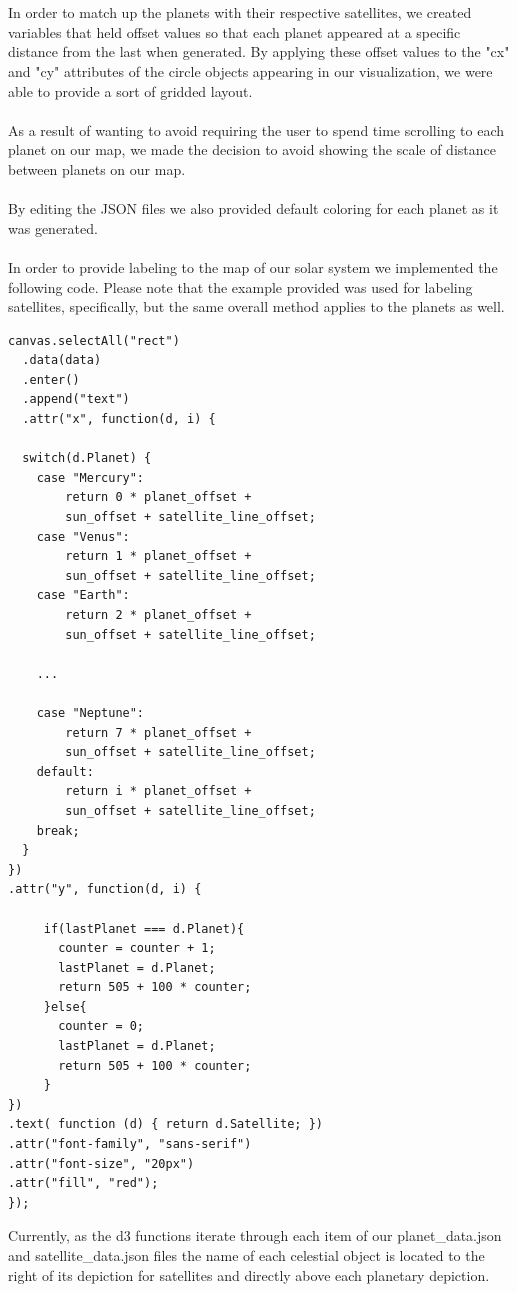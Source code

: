 \documentclass[journal]{vgtc}                %
\begin{document}
\\\\
In order to match up the planets with their respective satellites, we created variables that held offset values so that each planet appeared at a specific distance from the last when generated. By applying these offset values to the "cx" and "cy" attributes of the circle objects appearing in our visualization, we were able to provide a sort of gridded layout. 
\\\\
As a result of wanting to avoid requiring the user to spend time scrolling to each planet on our map, we made the decision to avoid showing the scale of distance between planets on our map. 
\\\\
By editing the JSON files we also provided default coloring for each planet as it was generated.
\\\\
In order to provide labeling to the map of our solar system we implemented the following code. Please note that the example provided was used for labeling satellites, specifically, but the same overall method applies to the planets as well. 
\begin{lstlisting}[frame=single]
canvas.selectAll("rect")
  .data(data)
  .enter()
  .append("text")
  .attr("x", function(d, i) { 

  switch(d.Planet) {
    case "Mercury":
    	return 0 * planet_offset + 
    	sun_offset + satellite_line_offset;
    case "Venus":
    	return 1 * planet_offset + 
    	sun_offset + satellite_line_offset;
    case "Earth":
    	return 2 * planet_offset + 
    	sun_offset + satellite_line_offset;

    ...

    case "Neptune":
    	return 7 * planet_offset + 
    	sun_offset + satellite_line_offset;
    default:
    	return i * planet_offset + 
    	sun_offset + satellite_line_offset;
    break;
  }
})
.attr("y", function(d, i) {
    
     if(lastPlanet === d.Planet){
       counter = counter + 1;
       lastPlanet = d.Planet;
       return 505 + 100 * counter;
     }else{
       counter = 0;
       lastPlanet = d.Planet;
       return 505 + 100 * counter;
     }
})
.text( function (d) { return d.Satellite; })
.attr("font-family", "sans-serif")
.attr("font-size", "20px")
.attr("fill", "red");
});
\end{lstlisting}
Currently, as the d3 functions iterate through each item of our planet\_data.json and satellite\_data.json files the name of each celestial object is located to the right of its depiction for satellites and directly above each planetary depiction.
\end{document}
